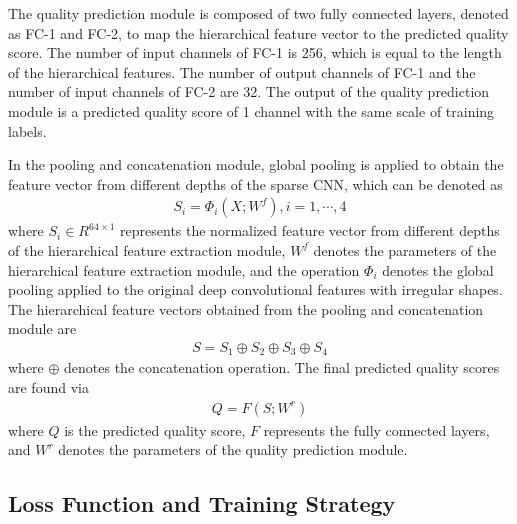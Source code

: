 \documentclass[acmsmall]{acmart}
\begin{document}
\par The quality prediction module is composed of two fully connected layers, denoted as FC-1 and FC-2, to map the hierarchical feature vector to the predicted quality score. The number of input channels of FC-1 is 256, which is equal to the length of the hierarchical features. The number of output channels of FC-1 and the number of input channels of FC-2 are 32. The output of the quality prediction module is a predicted quality score of 1 channel with the same scale of training labels.
\par In the pooling and concatenation module, global pooling is applied to obtain the feature vector from different depths of the sparse CNN, which can be denoted as
\begin{align}
{S_i} = {\Phi _i}(X;{W^f}),i = 1, \cdots ,4
\end{align}
where ${S_i} \in {R^{64 \times 1}}$ represents the normalized feature vector from different depths of the hierarchical feature extraction module, $W^{f}$ denotes the parameters of the hierarchical feature extraction module, and the operation $\Phi _i$ denotes the global pooling applied to the original deep convolutional features with irregular shapes. The hierarchical feature vectors obtained from the pooling and concatenation module are
\begin{align}
S = {S_1} \oplus {S_2} \oplus {S_3} \oplus {S_4}
\end{align}
where $\oplus$ denotes the concatenation operation. The final predicted quality scores are found via
\begin{align}
Q = F(S;{W^r})
\end{align}
where $Q$ is the predicted quality score, $F$ represents the fully connected layers, and $W^r$ denotes the parameters of the quality prediction module.

\subsection{Loss Function and Training Strategy}
\end{document}
